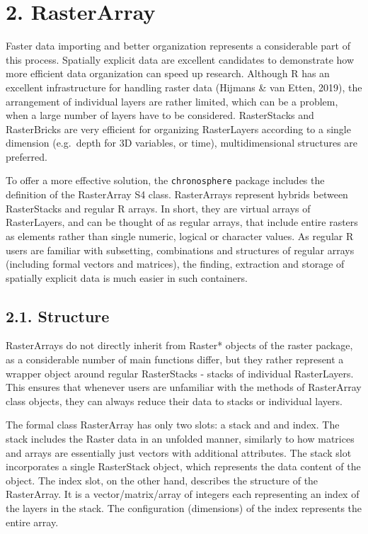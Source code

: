 \documentclass[]{article}
\begin{document}
\section{2. RasterArray}\label{rasterarray}

Faster data importing and better organization represents a considerable
part of this process. Spatially explicit data are excellent candidates
to demonstrate how more efficient data organization can speed up
research. Although R has an excellent infrastructure for handling raster
data (Hijmans \& van Etten, 2019), the arrangement of individual layers
are rather limited, which can be a problem, when a large number of
layers have to be considered. RasterStacks and RasterBricks are very
efficient for organizing RasterLayers according to a single dimension
(e.g.~depth for 3D variables, or time), multidimensional structures are
preferred.

To offer a more effective solution, the \texttt{chronosphere} package
includes the definition of the RasterArray S4 class. RasterArrays
represent hybrids between RasterStacks and regular R arrays. In short,
they are virtual arrays of RasterLayers, and can be thought of as
regular arrays, that include entire rasters as elements rather than
single numeric, logical or character values. As regular R users are
familiar with subsetting, combinations and structures of regular arrays
(including formal vectors and matrices), the finding, extraction and
storage of spatially explicit data is much easier in such containers.

\subsection{2.1. Structure}\label{structure}

RasterArrays do not directly inherit from Raster* objects of the raster
package, as a considerable number of main functions differ, but they
rather represent a wrapper object around regular RasterStacks - stacks
of individual RasterLayers. This ensures that whenever users are
unfamiliar with the methods of RasterArray class objects, they can
always reduce their data to stacks or individual layers.

The formal class RasterArray has only two slots: a stack and and index.
The stack includes the Raster data in an unfolded manner, similarly to
how matrices and arrays are essentially just vectors with additional
attributes. The stack slot incorporates a single RasterStack object,
which represents the data content of the object. The index slot, on the
other hand, describes the structure of the RasterArray. It is a
vector/matrix/array of integers each representing an index of the layers
in the stack. The configuration (dimensions) of the index represents the
entire array.
\end{document}
